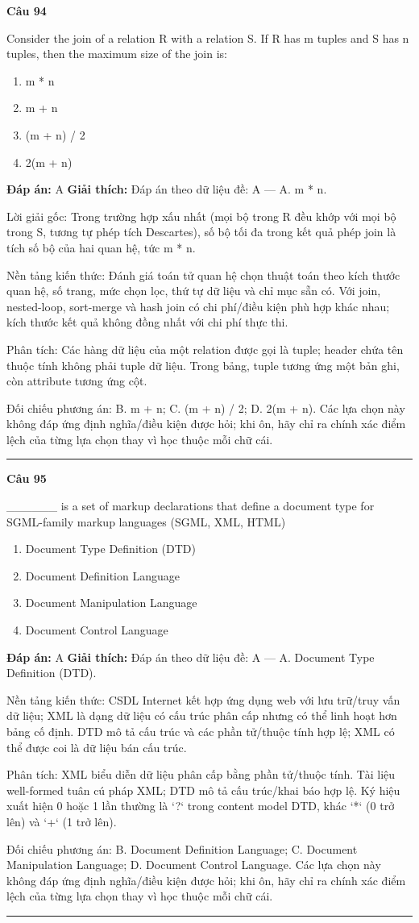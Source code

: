 \documentclass[11pt,a4paper]{article}
\newenvironment{question}[1]{%
  \par\vspace{1em}\noindent\textbf{\large Câu #1}\par\vspace{0.4em}
}{%
  \par\vspace{1em}\hrule\vspace{0.6em}
}
\newenvironment{choices}{%
  \begin{enumerate}[label=\textbf{\Alph*.},leftmargin=2.2em,itemsep=2pt,topsep=3pt]
}{%
  \end{enumerate}
}
\newcommand{\choice}{\item}
\begin{document}
\begin{question}{94}
Consider the join of a relation R with a relation S. If R has m tuples and S has n tuples, then the maximum size of the join is:
\begin{choices}
\choice m * n
\choice m + n
\choice (m + n) / 2
\choice 2(m + n)
\end{choices}
\textbf{Đáp án:} A
\textbf{Giải thích:} Đáp án theo dữ liệu đề: A — A. m * n.

Lời giải gốc: Trong trường hợp xấu nhất (mọi bộ trong R đều khớp với mọi bộ trong S, tương tự phép tích Descartes), số bộ tối đa trong kết quả phép join là tích số bộ của hai quan hệ, tức m * n.

Nền tảng kiến thức: Đánh giá toán tử quan hệ chọn thuật toán theo kích thước quan hệ, số trang, mức chọn lọc, thứ tự dữ liệu và chỉ mục sẵn có. Với join, nested-loop, sort-merge và hash join có chi phí/điều kiện phù hợp khác nhau; kích thước kết quả không đồng nhất với chi phí thực thi.

Phân tích: Các hàng dữ liệu của một relation được gọi là tuple; header chứa tên thuộc tính không phải tuple dữ liệu. Trong bảng, tuple tương ứng một bản ghi, còn attribute tương ứng cột.

Đối chiếu phương án: B. m + n; C. (m + n) / 2; D. 2(m + n). Các lựa chọn này không đáp ứng định nghĩa/điều kiện được hỏi; khi ôn, hãy chỉ ra chính xác điểm lệch của từng lựa chọn thay vì học thuộc mỗi chữ cái.
\end{question}

\begin{question}{95}
______ is a set of markup declarations that define a document type for SGML-family markup languages (SGML, XML, HTML)
\begin{choices}
\choice Document Type Definition (DTD)
\choice Document Definition Language
\choice Document Manipulation Language
\choice Document Control Language
\end{choices}
\textbf{Đáp án:} A
\textbf{Giải thích:} Đáp án theo dữ liệu đề: A — A. Document Type Definition (DTD).

Nền tảng kiến thức: CSDL Internet kết hợp ứng dụng web với lưu trữ/truy vấn dữ liệu; XML là dạng dữ liệu có cấu trúc phân cấp nhưng có thể linh hoạt hơn bảng cố định. DTD mô tả cấu trúc và các phần tử/thuộc tính hợp lệ; XML có thể được coi là dữ liệu bán cấu trúc.

Phân tích: XML biểu diễn dữ liệu phân cấp bằng phần tử/thuộc tính. Tài liệu well-formed tuân cú pháp XML; DTD mô tả cấu trúc/khai báo hợp lệ. Ký hiệu xuất hiện 0 hoặc 1 lần thường là `?` trong content model DTD, khác `*` (0 trở lên) và `+` (1 trở lên).

Đối chiếu phương án: B. Document Definition Language; C. Document Manipulation Language; D. Document Control Language. Các lựa chọn này không đáp ứng định nghĩa/điều kiện được hỏi; khi ôn, hãy chỉ ra chính xác điểm lệch của từng lựa chọn thay vì học thuộc mỗi chữ cái.
\end{question}
\end{document}
